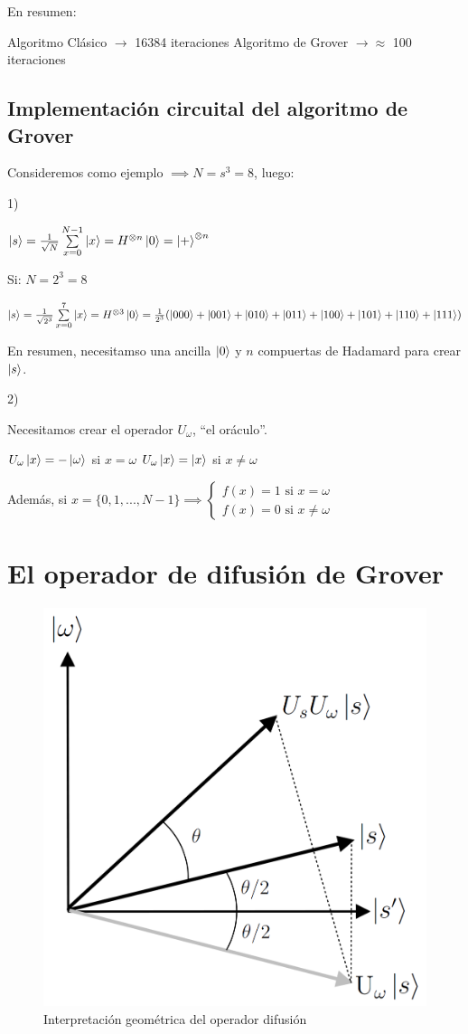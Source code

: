 En resumen:

Algoritmo Clásico $\rightarrow$ 16384 iteraciones
Algoritmo de Grover $\rightarrow \approx$ 100 iteraciones

\subsection{Implementación circuital del algoritmo de Grover}

Consideremos como ejemplo $\implies N = s^3 = 8$, luego:

1)

$\ket{s} = \frac{1}{\sqrt{N}} \sum\limits_{x=0}^{N-1} \ket{x} = H^{\otimes n}
\ket{0} = \ket{+}^{\otimes n}$

Si: $N = 2^3 = 8$

$\ket{s} = \frac{1}{\sqrt{2^3}} \sum\limits_{x=0}^{7} \ket{x} = H^{\otimes 3}
\ket{0} = \frac{1}{2^3} (\ket{000} + \ket{001} + \ket{010} + \ket{011} + \ket{100} + \ket{101} + \ket{110} + \ket{111})$

En resumen, necesitamso una ancilla $\ket{0}$ y $n$ compuertas de Hadamard para
crear $\ket{s}$.

2)

Necesitamos crear el operador $U_\omega$, ``el oráculo''.

$U_\omega \ket{x} = -\ket{\omega}$ si $x = \omega$
$U_\omega \ket{x} = \ket{x}$ si $x \neq \omega$

Además, si $x = \{0, 1, ... , N-1\} \implies \begin{cases} f(x) = 1 \text{ si }
  x = \omega \\ f(x) = 0 \text{ si } x \neq \omega \end{cases}$














\section{El operador de difusión de Grover}

\begin{figure}[H]
\centering \includegraphics[width=0.3\linewidth]{img/grover_geometry.png}
\caption{Interpretación geométrica del operador difusión}
\end{figure}

